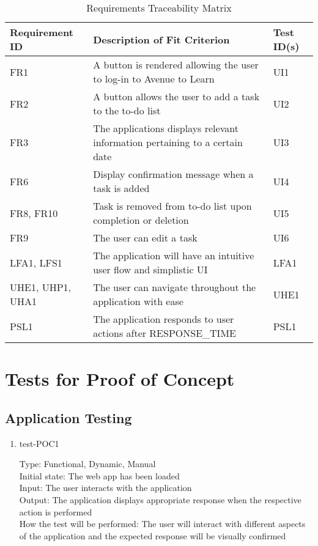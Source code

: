 \documentclass[12pt, titlepage]{article}
\begin{document}
\begin{table}[H]
\caption{Requirements Traceability Matrix}
\begin{center}
\begin{tabular}{ |m{7em}|m{20em}|m{6em}|} 
 \hline
 Requirement ID & Description of Fit Criterion & Test ID(s) \\ 
 \hline
 FR1 & A button is rendered allowing the user to log-in to Avenue to Learn & UI1 \\
 \hline
 FR2 & A button allows the user to add a task to the to-do list & UI2\\ 
 \hline
 FR3 & The applications displays relevant information pertaining to a certain date & UI3\\
 \hline 
 FR6 & Display confirmation message when a task is added & UI4\\
 \hline
 FR8, FR10 & Task is removed from to-do list upon completion or deletion & UI5\\
 \hline
 FR9 & The user can edit a task & UI6\\
 \hline
 LFA1, LFS1 & The application will have an intuitive user flow and simplistic UI & LFA1\\
 \hline
 UHE1, UHP1, UHA1 & The user can navigate throughout the application with ease & UHE1\\
 \hline 
 PSL1 & The application responds to user actions after RESPONSE\_TIME & PSL1\\
 \hline
\end{tabular}
\end{center}
\label{traceability}
\end{table}

\section{Tests for Proof of Concept}

\subsection{Application Testing}

\begin{enumerate}
\item{test-POC1\\}

Type: Functional, Dynamic, Manual\\
Initial state: The web app has been loaded\\
Input: The user interacts with the application\\
Output: The application displays appropriate response when the respective action is performed\\
How the test will be performed: The user will interact with different aspects of the application and the expected response will be visually confirmed
\end{enumerate}
\end{document}
